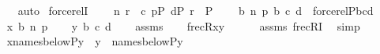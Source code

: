 \begin{isabellebody}
\ \ \ \ \isamarkupfalse%
\ auto\isanewline
{}\isamarkupfalse%
%
\endisatagproof
{\isafoldproof}%
%
\isadelimproof
\isanewline
%
\endisadelimproof
\isanewline
{}\isamarkupfalse%
\ forcerelI{}\ {\isacharcolon}{\kern0pt}\isanewline
\ \ \ {\isachardoublequoteopen}{\isasymlangle}n{}{\isacharcomma}{\kern0pt}\ r{\isasymrangle}\ {\isasymin}\ c{\isachardoublequoteclose}\ {\isachardoublequoteopen}p{\isasymin}P{\isachardoublequoteclose}\ {\isachardoublequoteopen}d{\isasymin}P{\isachardoublequoteclose}\ {\isachardoublequoteopen}r\ {\isasymin}\ P{\isachardoublequoteclose}\isanewline
\ \ \ {\isachardoublequoteopen}{\isasymlangle}{\isasymlangle}{}{\isacharcomma}{\kern0pt}\ b{\isacharcomma}{\kern0pt}\ n{}{\isacharcomma}{\kern0pt}\ p{\isasymrangle}{\isacharcomma}{\kern0pt}{\isasymlangle}{}{\isacharcomma}{\kern0pt}\ b{\isacharcomma}{\kern0pt}\ c{\isacharcomma}{\kern0pt}\ d{\isasymrangle}{\isasymrangle}\ {\isasymin}\ forcerel{\isacharparenleft}{\kern0pt}P{\isacharcomma}{\kern0pt}{\isasymlangle}{}{\isacharcomma}{\kern0pt}b{\isacharcomma}{\kern0pt}c{\isacharcomma}{\kern0pt}d{\isasymrangle}{\isacharparenright}{\kern0pt}{\isachardoublequoteclose}\isanewline
%
\isadelimproof
%
\endisadelimproof
%
\isatagproof
{}\isamarkupfalse%
\ {\isacharminus}{\kern0pt}\isanewline
\ \ \isamarkupfalse%
\ {\isacharquery}{\kern0pt}x{\isacharequal}{\kern0pt}{\isachardoublequoteopen}{\isasymlangle}{}{\isacharcomma}{\kern0pt}\ b{\isacharcomma}{\kern0pt}\ n{}{\isacharcomma}{\kern0pt}\ p{\isasymrangle}{\isachardoublequoteclose}\isanewline
\ \ \isamarkupfalse%
\ {\isacharquery}{\kern0pt}y{\isacharequal}{\kern0pt}{\isachardoublequoteopen}{\isasymlangle}{}{\isacharcomma}{\kern0pt}\ b{\isacharcomma}{\kern0pt}\ c{\isacharcomma}{\kern0pt}\ d{\isasymrangle}{\isachardoublequoteclose}\isanewline
\ \ \isamarkupfalse%
\ assms\isanewline
\ \ \isamarkupfalse%
\ {\isachardoublequoteopen}frecR{\isacharparenleft}{\kern0pt}{\isacharquery}{\kern0pt}x{\isacharcomma}{\kern0pt}{\isacharquery}{\kern0pt}y{\isacharparenright}{\kern0pt}{\isachardoublequoteclose}\isanewline
\ \ \ \ \isamarkupfalse%
\ assms\ frecRI{}\ \isamarkupfalse%
\ simp\isanewline
\ \ \isamarkupfalse%
\isanewline
\ \ \isamarkupfalse%
\ {\isachardoublequoteopen}{\isacharquery}{\kern0pt}x{\isasymin}names{\isacharunderscore}{\kern0pt}below{\isacharparenleft}{\kern0pt}P{\isacharcomma}{\kern0pt}{\isacharquery}{\kern0pt}y{\isacharparenright}{\kern0pt}{\isachardoublequoteclose}\ \ {\isachardoublequoteopen}{\isacharquery}{\kern0pt}y\ {\isasymin}\ names{\isacharunderscore}{\kern0pt}below{\isacharparenleft}{\kern0pt}P{\isacharcomma}{\kern0pt}{\isacharquery}{\kern0pt}y{\isacharparenright}{\kern0pt}{\isachardoublequoteclose}\isanewline

\end{isabellebody}
